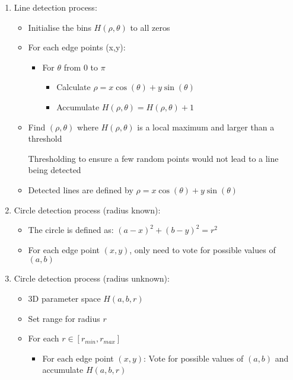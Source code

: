 \documentclass[9pt]{article}
\begin{document}
\begin{multicols*}{2}
\begin{enumerate}
            \item Line detection process:
            \begin{itemize}
                \item Initialise the bins $H(\rho, \theta)$ to all zeros 
                \item For each edge points (x,y):
                \begin{itemize}
                    \item For $\theta$ from $0$ to $\pi$
                    \begin{itemize}
                        \item Calculate $\rho = x\cos(\theta) + y\sin(\theta)$
                        \item Accumulate $H(\rho, \theta) = H(\rho, \theta) + 1$
                    \end{itemize}
                \end{itemize}
                \item Find $(\rho, \theta)$ where $H(\rho, \theta)$ is a local maximum and larger than a threshold 
                
                Thresholding to ensure a few random points would not lead to a line being detected 

                \item Detected lines are defined by $\rho = x\cos(\theta) + y\sin(\theta)$
            \end{itemize}

            \item Circle detection process (radius known):
            \begin{itemize}
                \item The circle is defined as: $(a-x)^2 + (b-y)^2 = r^2$ 
                \item For each edge point $(x,y)$, only need to vote for possible values of $(a,b)$ 
            \end{itemize}

            \item Circle detection process (radius unknown):
            \begin{itemize}
                \item 3D parameter space $H(a,b,r)$
                \item Set range for radius $r$
                \item For each $r \in [r_{min}, r_{max}]$
                \begin{itemize}
                    \item For each edge point $(x,y)$: Vote for possible values of $(a,b)$ and accumulate $H(a,b,r)$
                \end{itemize}
            \end{itemize}


\end{enumerate}
\end{multicols*}
\end{document}

